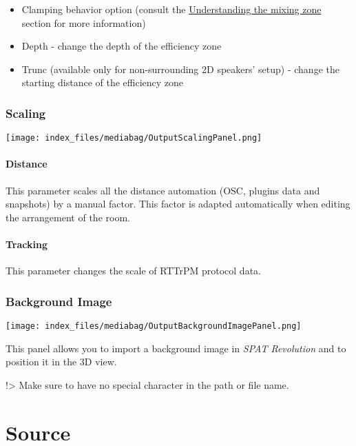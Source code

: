 \documentclass[
  letterpaper,
  DIV=11,
  numbers=noendperiod]{scrreport}
\providecommand{\tightlist}{%
  \setlength{\itemsep}{0pt}\setlength{\parskip}{0pt}}\usepackage{longtable,booktabs,array}
\begin{document}
\begin{itemize}
\tightlist
\item
  Clamping behavior option (consult the
  \href{Spat_Environment_Understanding_the_3D_View.md}{Understanding the
  mixing zone} section for more information)
\item
  Depth - change the depth of the efficiency zone
\item
  Trunc (available only for non-surrounding 2D speakers' setup) - change
  the starting distance of the efficiency zone
\end{itemize}

\hypertarget{scaling}{%
\subsection{Scaling}\label{scaling}}

\texttt{[image: index\_files/mediabag/OutputScalingPanel.png]}

\hypertarget{distance}{%
\subsubsection{Distance}\label{distance}}

This parameter scales all the distance automation (OSC, plugins data and
snapshots) by a manual factor. This factor is adapted automatically when
editing the arrangement of the room.

\hypertarget{tracking-2}{%
\subsubsection{Tracking}\label{tracking-2}}

This parameter changes the scale of RTTrPM protocol data.

\hypertarget{background-image}{%
\subsection{Background Image}\label{background-image}}

\texttt{[image: index\_files/mediabag/OutputBackgroundImagePanel.png]}

This panel allows you to import a background image in \emph{SPAT
Revolution} and to position it in the 3D view.

!\textgreater{} Make sure to have no special character in the path or
file name.

\hypertarget{source}{%
\chapter{Source}\label{source}}
\end{document}
